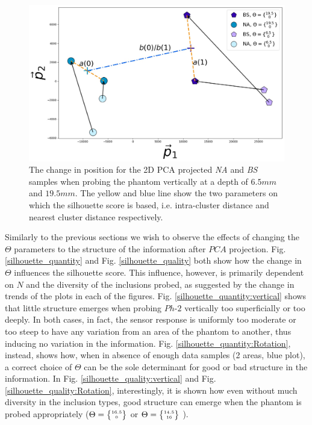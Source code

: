 \documentclass[]{interact}
\theoremstyle{plain}%
\theoremstyle{definition}
\theoremstyle{remark}
\begin{document}
\begin{figure}[]
	\centering
	\includegraphics[width=.7\textwidth]{./figs/flow.jpg}\hspace{0.07\textwidth}
	\caption{The change in position for the 2D PCA projected \textit{NA} and \textit{BS} samples 
		when probing the phantom vertically at a depth of $6.5mm$ and $19.5mm$. The yellow and blue line 
		show the two parameters on which the silhouette score is based, i.e. intra-cluster distance and 
		nearest cluster distance respectively.}
	\label{flow}
\end{figure}

Similarly to the previous sections we wish to observe the effects of changing the $\Theta$ parameters
to the structure of the information after $PCA$ projection. Fig. \ref{silhouette_quantity} and 
Fig. \ref{silhouette_quality} both show how the change in $\Theta$ 
influences the silhouette score. This influence, however, is primarily dependent 
on $N$ and the diversity of the inclusions probed, as suggested by the change in 
trends of the plots in each of the figures. Fig. \ref{silhouette_quantity:vertical} shows 
that little structure emerges when probing $Ph\text{-}2$ vertically too superficially or too deeply. 
In both cases, in fact, the sensor response is uniformly too moderate or too steep to have any variation 
from an area of the phantom to another, thus inducing no variation in the information. Fig. 
\ref{silhouette_quantity:Rotation}, instead, shows how, when in absence of enough data samples (2 areas, blue plot), 
a correct choice of $\Theta$ can be the sole determinant for good or bad structure in the information. 
In Fig. \ref{silhouette_quality:vertical} and Fig. \ref{silhouette_quality:Rotation}, interestingly, it is shown 
how even without much diversity in the inclusion types, good structure can emerge when the phantom is probed appropriately
($\Theta = \tiny{\begin{Bmatrix}16.5\\ 0\end{Bmatrix}}$ or $\Theta = \tiny{\begin{Bmatrix}14.5\\ 16\end{Bmatrix}}$ ).
\end{document}
